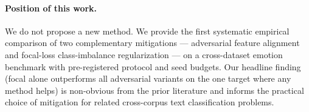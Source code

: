 \paragraph{Position of this work.}
We do not propose a new method. We provide the first systematic
empirical comparison of two complementary mitigations — adversarial
feature alignment and focal-loss class-imbalance regularization —
on a cross-dataset emotion benchmark with pre-registered protocol and
seed budgets. Our headline finding (focal alone outperforms all
adversarial variants on the one target where any method helps) is
non-obvious from the prior literature and informs the practical
choice of mitigation for related cross-corpus text classification
problems.

